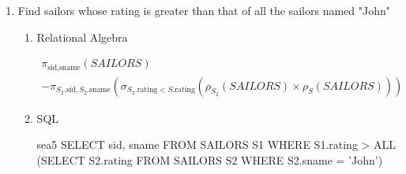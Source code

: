 \begin{enumerate}
\begin{enumerate}
                        \begin{equation*}
                              \pi_{\text{sid}} - \pi_{\text{sid}}(SAILORS \bowtie \sigma_{\text{date\_of\_birth}\; >\; \text{Jan 2018}}(RESERVES))
                        \end{equation*}

                  \item SQL
                        \begin{sqlQuery}{sea4}
                    SELECT sid FROM SAILORS 
                    WHERE sid NOT IN 
                        (SELECT sid FROM RESERVES 
                        WHERE date_of_birth > '2018-01-01')
                    \end{sqlQuery}

                  \item Output
                        \begin{lstlisting}[style=output]
practicals=# \i /home/sql/sea4.sql
sid
-----
3
4
5
(3 rows)
                        \end{lstlisting}

            \end{enumerate}

      \item  Find sailors whose rating is greater than that of all the sailors named "John"
            \begin{enumerate}
                  \item Relational Algebra

                        \begin{multline*}
                              \pi_{\text{sid}, \text{sname}}(SAILORS) \\
                              - \pi_{S_2.\text{sid},S_2.\text{sname}}(\sigma_{S_2.\text{rating} < S.\text{rating}}(\rho_{S_2}(SAILORS)\times \rho_S(SAILORS)))
                        \end{multline*}
                        \pagebreak

                  \item SQL

                        \begin{sqlQuery}{sea5}
                        SELECT sid, sname FROM SAILORS S1
                        WHERE S1.rating > ALL
                                (SELECT S2.rating FROM SAILORS S2
                                WHERE S2.sname = 'John')
                    \end{sqlQuery}


\end{enumerate}
\end{enumerate}
